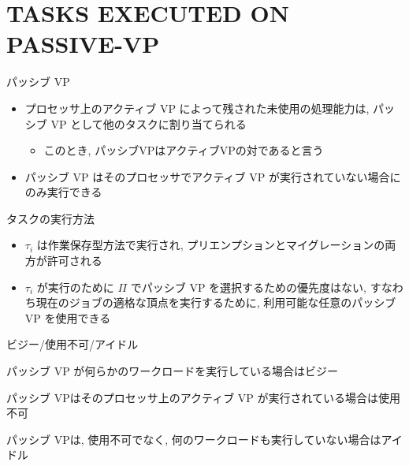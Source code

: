 
\section{TASKS EXECUTED ON PASSIVE-VP}
\label{sec: tasks executed on passive-vp}

\begin{frame}{パッシブ VP}
    \begin{definition}[パッシブVP]
        \setlength{\linewidth}{0.98\columnwidth}
        \begin{itemize}
            \item プロセッサ上のアクティブ VP によって残された未使用の処理能力は, パッシブ VP として他のタスクに割り当てられる
                  \begin{itemize}
                      \item このとき, パッシブVPはアクティブVPの対であると言う
                  \end{itemize}
            \item パッシブ VP はそのプロセッサでアクティブ VP が実行されていない場合にのみ実行できる
        \end{itemize}
    \end{definition}
\end{frame}

\begin{frame}{タスクの実行方法}
    \begin{itemize}
        \item $\tau_{i}$ は作業保存型方法で実行され, プリエンプションとマイグレーションの両方が許可される
        \item $\tau_{i}$ が実行のために $\Pi$ でパッシブ VP を選択するための優先度はない, すなわち現在のジョブの適格な頂点を実行するために, 利用可能な任意のパッシブ VP を使用できる
    \end{itemize}
\end{frame}

\begin{frame}{ビジー/使用不可/アイドル}
    \begin{definition}[ビジー]
        パッシブ VP が何らかのワークロードを実行している場合はビジー
    \end{definition}
    \begin{definition}[使用不可]
        パッシブ VPはそのプロセッサ上のアクティブ VP が実行されている場合は使用不可
    \end{definition}
    \begin{definition}[アイドル]
        パッシブ VPは, 使用不可でなく, 何のワークロードも実行していない場合はアイドル
    \end{definition}
\end{frame}

